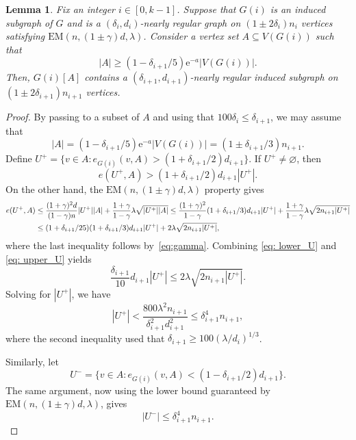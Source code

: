 \documentclass[reqno,a4paper]{amsart}
\newtheorem{lemma}[theorem]{Lemma}
\theoremstyle{definition}
\newcommand{\e}{\mathrm{e}}
\newcommand{\EM}{\mathrm{EM}}
\begin{document}
\begin{lemma}\label{l: good regular subgraph}
Fix an integer $i\in [0,k-1]$. Suppose that $G(i)$  is an induced subgraph of $G$ and is a $(\delta_i,d_i)$-nearly regular graph on $(1\pm2\delta_i)n_i$ vertices satisfying $\EM(n,(1\pm \gamma)d,\lambda)$. Consider a vertex set $A\subseteq V(G(i))$ such that
\[
    |A|\ge (1-\delta_{i+1}/5)\e^{-a}|V(G(i))|.
\]
Then, $G(i)[A]$ contains a $(\delta_{i+1},d_{i+1})$-nearly regular induced subgraph on $(1\pm2\delta_{i+1})n_{i+1}$ vertices.
\end{lemma}
\begin{proof}
By passing to a subset of $A$ and using that $100\delta_i\le \delta_{i+1}$, we may assume that
\begin{equation}\label{eq:|A|}
    |A|=(1-\delta_{i+1}/5)\e^{-a}|V(G(i))| =(1\pm\delta_{i+1}/3)n_{i+1}.    
\end{equation}
Define $U^+=\{v\in A:e_{G(i)}(v,A)>(1+\delta_{i+1}/2)d_{i+1}\}$.
If $U^+\neq\varnothing$, then
\begin{equation}\label{eq: lower_U}
    e(U^+,A)>(1+\delta_{i+1}/2)d_{i+1}|U^+|.
\end{equation}
On the other hand, the $\EM(n,(1\pm \gamma)d,\lambda)$ property gives
\begin{align}\label{eq: upper_U}\notag
    e(U^+,A)&\le \frac{(1+\gamma)^2d}{(1-\gamma)n}|U^+||A|+\frac{1+\gamma}{1-\gamma}\lambda\sqrt{|U^+||A|}
    \le \frac{(1+\gamma)^2}{1-\gamma}(1+\delta_{i+1}/3)d_{i+1}|U^+|+\frac{1+\gamma}{1-\gamma}\lambda\sqrt{2n_{i+1}|U^+|}\\
    &\le (1+\delta_{i+1}/25)(1+\delta_{i+1}/3)d_{i+1}|U^+|+2\lambda\sqrt{2n_{i+1}|U^+|},
\end{align}
where the last inequality follows by~\eqref{eq:gamma}. Combining \eqref{eq: lower_U} and \eqref{eq: upper_U} yields
\[
    \frac{\delta_{i+1}}{10}d_{i+1}|U^+|\le 2\lambda\sqrt{2n_{i+1}|U^+|}.
\]
Solving for $|U^+|$, we have
\begin{equation}\label{eq: high-set-bound}
    |U^+|<\frac{800\lambda^2 n_{i+1}}{\delta_{i+1}^2d_{i+1}^2}
    \le \delta_{i+1}^4n_{i+1},
\end{equation}
where the second inequality used that $\delta_{i+1}\ge 100(\lambda/d_i)^{1/3}$. 

Similarly, let
\[
    U^-=\{v\in A:e_{G(i)}(v,A)<(1-\delta_{i+1}/2)d_{i+1}\}.
\]
The same argument, now using the lower bound guaranteed by $\EM(n,(1\pm \gamma)d,\lambda)$, gives
\begin{equation}\label{eq: low-set-bound}
    |U^-|\le \delta_{i+1}^4n_{i+1}.
\end{equation}


\end{proof}
\end{document}
